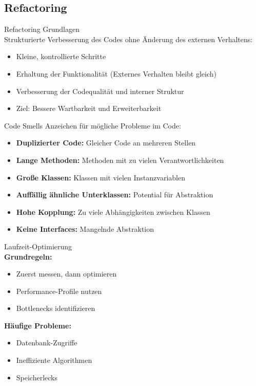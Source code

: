 \columnbreak


\subsection{Refactoring}

\begin{definition}{Refactoring Grundlagen}\\
Strukturierte Verbesserung des Codes ohne Änderung des externen Verhaltens:
\begin{itemize}
    \item Kleine, kontrollierte Schritte
    \item Erhaltung der Funktionalität (Externes Verhalten bleibt gleich)
    \item Verbesserung der Codequalität und interner Struktur
    \item Ziel: Bessere Wartbarkeit und Erweiterbarkeit
\end{itemize}
\end{definition}

\begin{definition}{Code Smells}
Anzeichen für mögliche Probleme im Code:
\begin{itemize}
    \item \textbf{Duplizierter Code:} Gleicher Code an mehreren Stellen
    \item \textbf{Lange Methoden:} Methoden mit zu vielen Verantwortlichkeiten
    \item \textbf{Große Klassen:} Klassen mit vielen Instanzvariablen
    \item \textbf{Auffällig ähnliche Unterklassen:} Potential für Abstraktion
    \item \textbf{Hohe Kopplung:} Zu viele Abhängigkeiten zwischen Klassen
    \item \textbf{Keine Interfaces:} Mangelnde Abstraktion
\end{itemize}
\end{definition}

\begin{concept}{Laufzeit-Optimierung}\\
\textbf{Grundregeln:}
\begin{itemize}
    \item Zuerst messen, dann optimieren
    \item Performance-Profile nutzen
    \item Bottlenecks identifizieren
\end{itemize}

\textbf{Häufige Probleme:}
\begin{itemize}
    \item Datenbank-Zugriffe
    \item Ineffiziente Algorithmen
    \item Speicherlecks
\end{itemize}
\end{concept}

